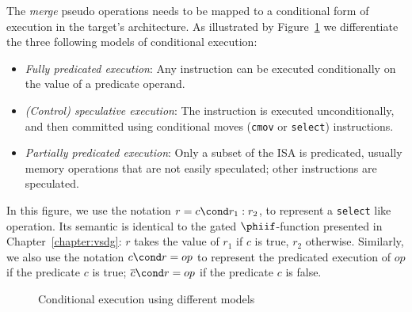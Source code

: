 The \textit{merge} pseudo operations needs to be mapped to a conditional form of execution in the target's architecture. As illustrated by Figure~\ref{fig:pred} we differentiate the three following models of conditional execution:
\begin{itemize}
\item \emph{Fully predicated execution}: Any instruction can be executed conditionally on the value of a predicate operand.
\item \emph{(Control) speculative execution}: The instruction is executed unconditionally, and then committed using conditional moves (\texttt{cmov} or \texttt{select}) instructions.
\item \emph{Partially predicated execution}: Only a subset of the ISA is predicated, usually memory operations that are not easily speculated; other instructions are speculated.
\end{itemize}
In this figure, we use the notation $r = c \cond r_1:r_2$, to represent a \texttt{select} like operation. Its semantic is identical to the gated $\phiif$-function presented in Chapter~\ref{chapter:vsdg}: $r$ takes the value of $r_1$ if $c$ is true, $r_2$ otherwise. Similarly, we also use the notation $c \cond r = op$ to represent the predicated execution of $op$ if the predicate $c$ is true; $\overline{c} \cond r = op$ if the predicate $c$ is false.

\begin{figure}[h]
\footnotesize
{}
\hfill
{} \hfill
{}
\caption{Conditional execution using different models}
\label{fig:pred}
\end{figure}

